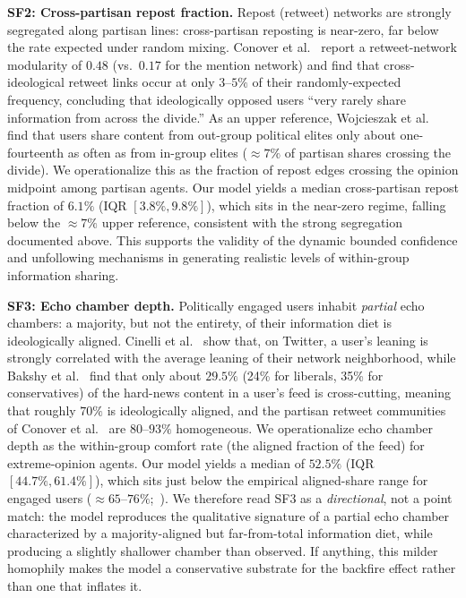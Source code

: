 \documentclass[pdflatex,sn-mathphys-num]{sn-jnl}%
\theoremstyle{thmstyleone}%
\theoremstyle{thmstyletwo}%
\theoremstyle{thmstylethree}%
\begin{document}
\noindent\textbf{SF2: Cross-partisan repost fraction.}
Repost (retweet) networks are strongly segregated along partisan lines:
cross-partisan reposting is near-zero, far below the rate expected under
random mixing. Conover et al.~\cite{Conover2011} report a retweet-network
modularity of $0.48$ (vs.\ $0.17$ for the mention network) and find that
cross-ideological retweet links occur at only $3$--$5\%$ of their
randomly-expected frequency, concluding that ideologically opposed users
``very rarely share information from across the divide.''
As an upper reference, Wojcieszak et al.~\cite{Wojcieszak2022} find that
users share content from out-group political elites only about
one-fourteenth as often as from in-group elites ($\approx 7\%$ of partisan
shares crossing the divide).
We operationalize this as the fraction of repost edges crossing the opinion
midpoint among partisan agents. Our model yields a median cross-partisan
repost fraction of $6.1\%$ (IQR $[3.8\%, 9.8\%]$), which sits in the
near-zero regime, falling below the $\approx 7\%$ upper reference, consistent
with the strong segregation documented above. This supports the validity of
the dynamic bounded confidence and unfollowing mechanisms in generating
realistic levels of within-group information sharing.

\noindent\textbf{SF3: Echo chamber depth.}
Politically engaged users inhabit \emph{partial} echo chambers: a
majority, but not the entirety, of their information diet is
ideologically aligned. Cinelli et al.~\cite{Cinelli2021} show that, on
Twitter, a user's leaning is strongly correlated with the average leaning of
their network neighborhood, while Bakshy et al.~\cite{Bakshy2015} find that
only about $29.5\%$ (24\% for liberals, 35\% for conservatives) of the hard-news content in a user's feed is
cross-cutting, meaning that roughly $70\%$ is ideologically aligned, and the
partisan retweet communities of Conover et al.~\cite{Conover2011} are
$80$--$93\%$ homogeneous.
We operationalize echo chamber depth as the within-group comfort rate
(the aligned fraction of the feed) for extreme-opinion agents.
Our model yields a median of $52.5\%$ (IQR $[44.7\%, 61.4\%]$), which sits
just below the empirical aligned-share range for engaged users
($\approx\!65$--$76\%$;~\cite{Bakshy2015}). We therefore read SF3 as a
\emph{directional}, not a point match: the model reproduces the qualitative
signature of a partial echo chamber characterized by a majority-aligned but far-from-total
information diet, while producing a slightly shallower chamber than
observed. If anything, this milder homophily makes the model a conservative
substrate for the backfire effect rather than one that inflates it.
\end{document}
